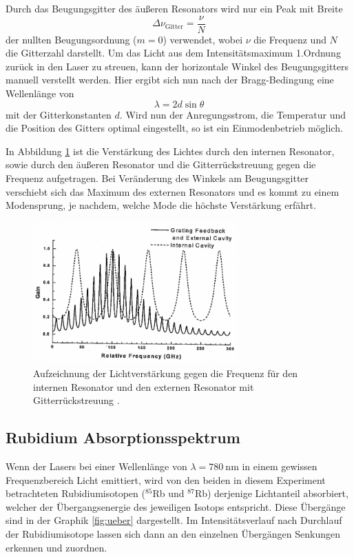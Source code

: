 Durch das Beugungsgitter des äußeren Resonators wird nur ein Peak mit Breite
\begin{equation}
  \Delta\nu_{\text{Gitter}} = \frac{\nu}{N}
\end{equation}
der nullten Beugungsordnung ($m=\num{0}$) verwendet, wobei $\nu$ die Frequenz
und $N$ die Gitterzahl darstellt. Um das Licht aus dem Intensitätsmaximum 1.Ordnung
zurück in den Laser zu streuen, kann der horizontale Winkel \theta des Beugungsgitters
manuell verstellt werden. Hier ergibt sich nun nach der Bragg-Bedingung eine
Wellenlänge von
\begin{equation}
    \lambda = 2d\sin{\theta}
\end{equation}
mit der Gitterkonstanten $d$. Wird nun der Anregungsstrom, die Temperatur und die
Position des Gitters optimal eingestellt, so ist ein Einmodenbetrieb möglich.


In Abbildung \ref{fig:gain_freq} ist die Verstärkung des Lichtes durch den internen
Resonator, sowie durch den äußeren Resonator und die Gitterrückstreuung gegen
die Frequenz aufgetragen. Bei Veränderung des Winkels am Beugungsgitter verschiebt
sich das Maximum des externen Resonators und es kommt zu einem Modensprung, je
nachdem, welche Mode die höchste Verstärkung erfährt.

\begin{figure}[htb]
  \centering
  \includegraphics[width=0.7\textwidth, angle=1, origin=c]{images/gain-freq.pdf}
  \caption{Aufzeichnung der Lichtverstärkung gegen die Frequenz für den internen
  Resonator und den externen Resonator mit Gitterrückstreuung \cite{anleitung}.}
  \label{fig:gain_freq}
\end{figure}
\newpage

\subsection{Rubidium Absorptionsspektrum}
Wenn der Lasers bei einer Wellenlänge von $\lambda = \SI{780}{\nano\meter}$ in
einem gewissen Frequenzbereich Licht emittiert, wird von den
beiden in diesem Experiment betrachteten Rubidiumisotopen ($^{85}$Rb und $^{87}$Rb)
derjenige Lichtanteil absorbiert, welcher der Übergangsenergie des jeweiligen
Isotops entspricht. Diese Übergänge sind in der Graphik \ref{fig:ueber} dargestellt.
Im Intensitätsverlauf nach Durchlauf der Rubidiumisotope lassen sich dann an den
einzelnen Übergängen Senkungen erkennen und zuordnen.


